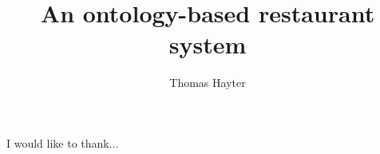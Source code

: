 \documentclass[12pt,BSc,wordcount,twoside,anon]{muthesis}
\begin{document}

\title{An ontology-based restaurant system}
\author{Thomas Hayter}

\beforeabstract



\afterabstract

I would like to thank...
\afterpreface












\appendix

\end{document}
